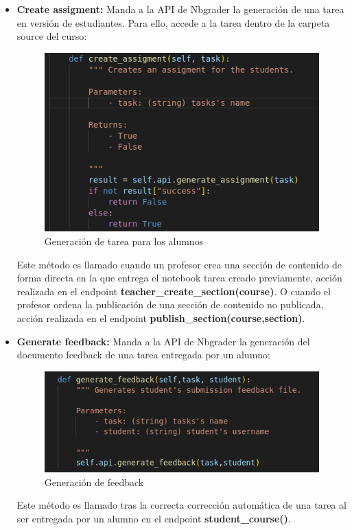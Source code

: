 \begin{itemize}
\item \textbf{Create assigment:} Manda a la API de Nbgrader la generación de una tarea en versión de estudiantes. Para ello, accede a la tarea dentro de la carpeta source del curso:
\begin{figure}[H]
    \centering
    \includegraphics[scale=0.8]{img/imgs-memoria/CrearTarea.PNG}
    \caption{Generación de tarea para los alumnos}
\end{figure}

Este método es llamado cuando un profesor crea una sección de contenido de forma directa en la que entrega el notebook tarea creado previamente, acción realizada en el endpoint \textbf{teacher\_create\_section(course)}. O cuando el profesor ordena la publicación de una sección de contenido no publicada, acción realizada en el endpoint \textbf{publish\_section(course,section)}.

\item \textbf{Generate feedback:} Manda a la API de Nbgrader la generación del documento feedback de una tarea entregada por un alumno:

\begin{figure}[H]
    \centering
    \includegraphics[scale=0.8]{img/imgs-memoria/generateFeedback.PNG}
    \caption{Generación de feedback}
\end{figure}

Este método es llamado tras la correcta corrección automática de una tarea al ser entregada por un alumno en el endpoint \textbf{student\_course()}.

\end{itemize}

